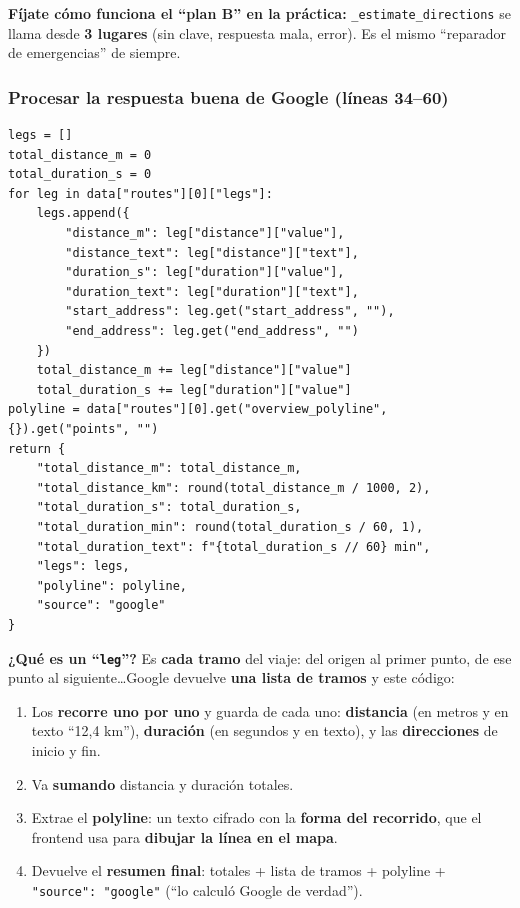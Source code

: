 \documentclass[11pt,a4paper]{article}
\begin{document}
\textbf{Fíjate cómo funciona el ``plan B'' en la práctica:} \texttt{\_estimate\_directions} se
llama desde \textbf{3 lugares} (sin clave, respuesta mala, error). Es el mismo
``reparador de emergencias'' de siempre.

\subsubsection{Procesar la respuesta buena de Google (líneas 34--60)}

\begin{lstlisting}
legs = []
total_distance_m = 0
total_duration_s = 0
for leg in data["routes"][0]["legs"]:
    legs.append({
        "distance_m": leg["distance"]["value"],
        "distance_text": leg["distance"]["text"],
        "duration_s": leg["duration"]["value"],
        "duration_text": leg["duration"]["text"],
        "start_address": leg.get("start_address", ""),
        "end_address": leg.get("end_address", "")
    })
    total_distance_m += leg["distance"]["value"]
    total_duration_s += leg["duration"]["value"]
polyline = data["routes"][0].get("overview_polyline", {}).get("points", "")
return {
    "total_distance_m": total_distance_m,
    "total_distance_km": round(total_distance_m / 1000, 2),
    "total_duration_s": total_duration_s,
    "total_duration_min": round(total_duration_s / 60, 1),
    "total_duration_text": f"{total_duration_s // 60} min",
    "legs": legs,
    "polyline": polyline,
    "source": "google"
}
\end{lstlisting}

\textbf{¿Qué es un ``\texttt{leg}''?} Es \textbf{cada tramo} del viaje: del origen al primer
punto, de ese punto al siguiente\dots Google devuelve \textbf{una lista de tramos} y este código:
\begin{enumerate}
    \item Los \textbf{recorre uno por uno} y guarda de cada uno: \textbf{distancia} (en metros
    y en texto ``12,4 km''), \textbf{duración} (en segundos y en texto), y las \textbf{direcciones}
    de inicio y fin.
    \item Va \textbf{sumando} distancia y duración totales.
    \item Extrae el \textbf{polyline}: un texto cifrado con la \textbf{forma del recorrido},
    que el frontend usa para \textbf{dibujar la línea en el mapa}.
    \item Devuelve el \textbf{resumen final}: totales + lista de tramos + polyline +
    \texttt{"source": "google"} (``lo calculó Google de verdad'').
\end{enumerate}
\end{document}
